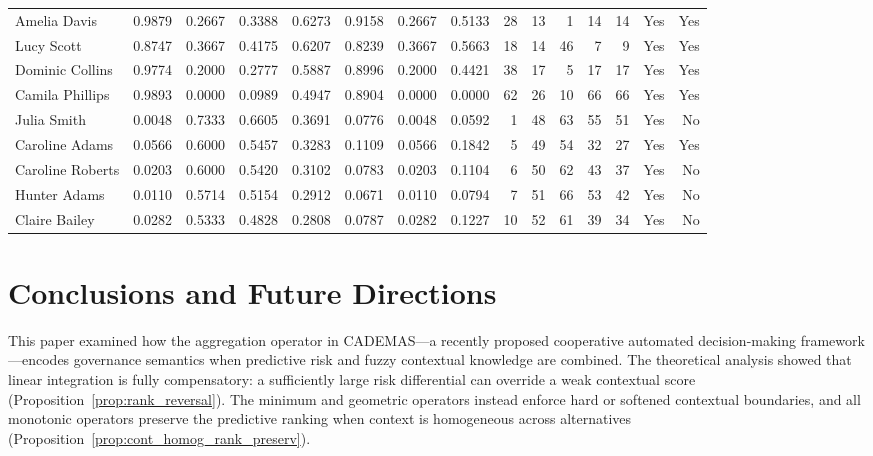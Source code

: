 \documentclass[mathematics,article,submit,moreauthors]{Definitions/mdpi}
\begin{document}
\begin{table}[t]
\begin{tabular}{lrrrrrrrrrrrrrr}
Amelia Davis & 0.9879 & 0.2667 & 0.3388 & 0.6273 & 0.9158 & 0.2667 & 0.5133 & 28 & 13 & 1 & 14 & 14 & Yes & Yes \\
Lucy Scott & 0.8747 & 0.3667 & 0.4175 & 0.6207 & 0.8239 & 0.3667 & 0.5663 & 18 & 14 & 46 & 7 & 9 & Yes & Yes \\
Dominic Collins & 0.9774 & 0.2000 & 0.2777 & 0.5887 & 0.8996 & 0.2000 & 0.4421 & 38 & 17 & 5 & 17 & 17 & Yes & Yes \\
Camila Phillips & 0.9893 & 0.0000 & 0.0989 & 0.4947 & 0.8904 & 0.0000 & 0.0000 & 62 & 26 & 10 & 66 & 66 & Yes & Yes \\
Julia Smith & 0.0048 & 0.7333 & 0.6605 & 0.3691 & 0.0776 & 0.0048 & 0.0592 & 1 & 48 & 63 & 55 & 51 & Yes & No \\
Caroline Adams & 0.0566 & 0.6000 & 0.5457 & 0.3283 & 0.1109 & 0.0566 & 0.1842 & 5 & 49 & 54 & 32 & 27 & Yes & Yes \\
Caroline Roberts & 0.0203 & 0.6000 & 0.5420 & 0.3102 & 0.0783 & 0.0203 & 0.1104 & 6 & 50 & 62 & 43 & 37 & Yes & No \\
Hunter Adams & 0.0110 & 0.5714 & 0.5154 & 0.2912 & 0.0671 & 0.0110 & 0.0794 & 7 & 51 & 66 & 53 & 42 & Yes & No \\
Claire Bailey & 0.0282 & 0.5333 & 0.4828 & 0.2808 & 0.0787 & 0.0282 & 0.1227 & 10 & 52 & 61 & 39 & 34 & Yes & No \\
\bottomrule
\end{tabular}
\end{table}

\section{Conclusions and Future Directions}\label{sect:conclusions}

This paper examined how the aggregation operator in CADEMAS---a recently proposed cooperative automated decision-making framework \citep{NovoaHernandez2026}---encodes governance semantics when predictive risk and fuzzy contextual knowledge are combined. The theoretical analysis showed that linear integration is fully compensatory: a sufficiently large risk differential can override a weak contextual score (Proposition~\ref{prop:rank_reversal}). The minimum and geometric operators instead enforce hard or softened contextual boundaries, and all monotonic operators preserve the predictive ranking when context is homogeneous across alternatives (Proposition~\ref{prop:cont_homog_rank_preserv}).
\end{document}
